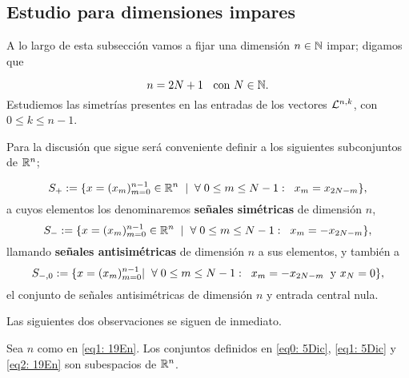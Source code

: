 \subsection{Estudio para dimensiones impares}
A lo largo de esta subsección vamos a fijar
una dimensión 
$n \in \mathbb{N}$ impar; digamos que

\begin{equation}
\label{eq1: 19En}
n=2N +1 \hspace{0.2cm} \text{ con } N \in \mathbb{N}.
\end{equation}
Estudiemos las simetrías presentes en las entradas
de los vectores $\mathcal{L}^{n,k}$, con $0 \leq k \leq n-1$.

Para la discusión que sigue será conveniente definir
a los siguientes subconjuntos de $\mathbb{R}^{n}$;

\begin{equation}
\label{eq0: 5Dic}
S_{+}:= \{ x=(x_{m})_{m=0}^{n-1} \in \mathbb{R}^{n} \hspace{0.2cm} 
| \hspace{0.2cm} \forall  
\hspace{0.1cm}
0 \leq m \leq N-1 : \hspace{0.2cm} x_{m}= x_{2N-m}\},
\end{equation}
a cuyos elementos los denominaremos
\textbf{señales simétricas} de dimensión $n$,
\begin{equation}
\label{eq1: 5Dic}
S_{-}:= \{ x=(x_{m})_{m=0}^{n-1}  \in \mathbb{R}^{n}
\hspace{0.2cm} |
\hspace{0.2cm} \forall  
\hspace{0.1cm}
0 \leq m \leq N-1 : \hspace{0.2cm} x_{m}= -x_{2N-m}\},
\end{equation}
llamando \textbf{señales antisimétricas} de dimensión $n$
a sus elementos, 
y también a
\begin{equation}
\label{eq2: 19En}
S_{-,0}:= \{ x=(x_{m})_{m=0}^{n-1}| \hspace{0.2cm} \forall  
\hspace{0.1cm}
0 \leq m \leq N-1 : \hspace{0.2cm} x_{m}= -x_{2N-m} 
\hspace{0.2cm} \text{y } x_{N}=0
\},
\end{equation}
el conjunto de señales antisimétricas de dimensión $n$
y entrada central nula.

Las siguientes dos observaciones se siguen de inmediato.

\begin{obs}
\label{obs: espacios de senales sim y antisim}
Sea $n$ como en \eqref{eq1: 19En}. 
Los conjuntos definidos en 
\eqref{eq0: 5Dic}, \eqref{eq1: 5Dic} y  \eqref{eq2: 19En}
son subespacios de $\mathbb{R}^{n}$.
\end{obs}

